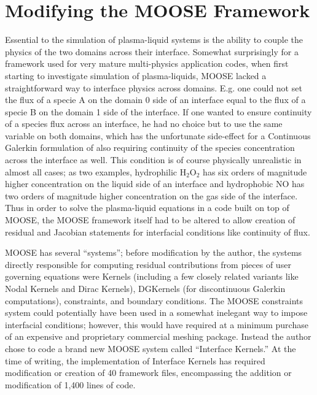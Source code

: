 \section{Modifying the MOOSE Framework}
\label{sec:moose}

Essential to the simulation of plasma-liquid systems is the ability to couple the physics of the two domains across their interface. Somewhat surprisingly for a framework used for very mature multi-physics application codes, when first starting to investigate simulation of plasma-liquids, MOOSE lacked a straightforward way to interface physics across domains. E.g. one could not set the flux of a specie A on the domain 0 side of an interface equal to the flux of a specie B on the domain 1 side of the interface. If one wanted to ensure continuity of a species flux across an interface, he had no choice but to use the same variable on both domains, which has the unfortunate side-effect for a Continuous Galerkin formulation of also requiring continuity of the species concentration across the interface as well. This condition is of course physically unrealistic in almost all cases; as two examples, hydrophilic H$_2$O$_2$ has six orders of magnitude higher concentration on the liquid side of an interface and hydrophobic NO has two orders of magnitude higher concentration on the gas side of the interface. Thus in order to solve the plasma-liquid equations in a code built on top of MOOSE, the MOOSE framework itself had to be altered to allow creation of residual and Jacobian statements for interfacial conditions like continuity of flux.

MOOSE has several ``systems''; before modification by the author, the systems directly responsible for computing residual contributions from pieces of user governing equations were Kernels (including a few closely related variants like Nodal Kernels and Dirac Kernels), DGKernels (for discontinuous Galerkin computations), constraints, and boundary conditions. The MOOSE constraints system could potentially have been used in a somewhat inelegant way to impose interfacial conditions; however, this would have required at a minimum purchase of an expensive and proprietary commercial meshing package. Instead the author chose to code a brand new MOOSE system called ``Interface Kernels.'' At the time of writing, the implementation of Interface Kernels has required modification or creation of 40 framework files, encompassing the addition or modification of 1,400 lines of code.

